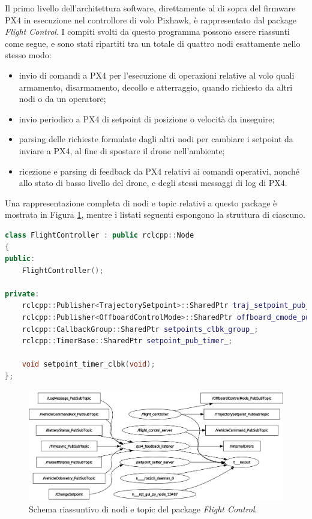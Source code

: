 \indent Il primo livello dell'architettura software, direttamente al di sopra del firmware PX4 in esecuzione nel controllore di volo Pixhawk, è rappresentato dal package \emph{Flight Control}. I compiti svolti da questo programma possono essere riassunti come segue, e sono stati ripartiti tra un totale di quattro nodi esattamente nello stesso modo:
\begin{itemize}
    \item invio di comandi a PX4 per l'esecuzione di operazioni relative al volo quali armamento, disarmamento, decollo e atterraggio, quando richiesto da altri nodi o da un operatore;
    \item invio periodico a PX4 di setpoint di posizione o velocità da inseguire;
    \item parsing delle richieste formulate dagli altri nodi per cambiare i setpoint da inviare a PX4, al fine di spostare il drone nell'ambiente;
    \item ricezione e parsing di feedback da PX4 relativi ai comandi operativi, nonché allo stato di basso livello del drone, e degli stessi messaggi di log di PX4.
\end{itemize}
Una rappresentazione completa di nodi e topic relativi a questo package è mostrata in Figura \ref{fig:fctrl}, mentre i listati seguenti espongono la struttura di ciascuno.
\newpage

\begin{lstlisting}[language={C++}, caption={Definizione del nodo \emph{flight\_controller}.}, label={lst:fcontroller}]
class FlightController : public rclcpp::Node
{
public:
    FlightController();

private:
    rclcpp::Publisher<TrajectorySetpoint>::SharedPtr traj_setpoint_pub_;
    rclcpp::Publisher<OffboardControlMode>::SharedPtr offboard_cmode_pub_;
    rclcpp::CallbackGroup::SharedPtr setpoints_clbk_group_;
    rclcpp::TimerBase::SharedPtr setpoint_pub_timer_;

    void setpoint_timer_clbk(void);
};
\end{lstlisting}

\vspace{3cm}

\begin{figure}[h!]
    \centering
    \includegraphics[width=\textwidth]{figs/chapter3/fctrl.png}
    \caption{Schema riassuntivo di nodi e topic del package \emph{Flight Control}.}
    \label{fig:fctrl}
\end{figure}
\clearpage

